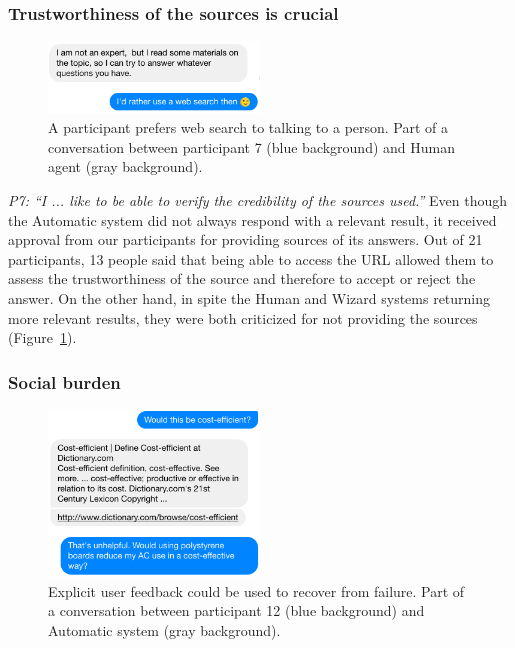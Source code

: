 \subsubsection{Trustworthiness of the sources is crucial}

\begin{figure}
    \centering
    \includegraphics[width=0.5\textwidth]{img/conversation_userstudy_prefersearch}
    \caption{A participant prefers web search to talking to a person. Part of a conversation between participant 7 (blue background) and Human agent (gray background).}
    \label{figure:conversation:user-study:prefersWebSearch}
\end{figure}

\textit{P7: ``I ... like to be able to verify the credibility of the sources used.''} Even though the Automatic system did not always respond with a relevant result, it received approval from our participants for providing sources of its answers. Out of 21 participants, 13 people said that being able to access the URL allowed them to assess the trustworthiness of the source and therefore to accept or reject the answer. On the other hand, in spite the Human and Wizard systems returning more relevant results, they were both criticized for not providing the sources (Figure~\ref{figure:conversation:user-study:prefersWebSearch}).

\subsubsection{Social burden}

\begin{figure}
    \centering
    \includegraphics[width=0.5\textwidth]{img/FullExample1}
    \caption{Explicit user feedback could be used to recover from failure. Part of a conversation between participant 12 (blue background) and Automatic system (gray background).}
    \label{figure:conversation:user-study:feedback}
\end{figure}

